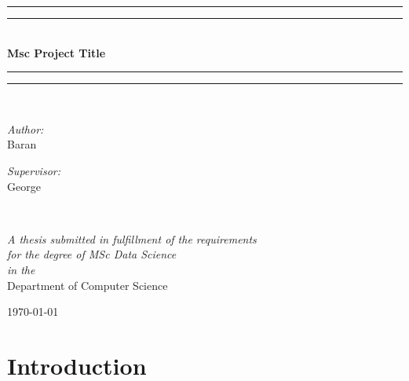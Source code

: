 \documentclass{article}
\begin{document}
\begin{titlepage}
    \begin{center}
        \vspace*{.06\textheight}{\scshape\LARGE Birkbeck, University of London\par}\vspace{1.5cm} %
        \rule[0.5ex]{\linewidth}{2pt}\vspace*{-\baselineskip}\vspace*{3.2pt}
        \rule[0.5ex]{\linewidth}{1pt}\\[\baselineskip]
        \huge{\bfseries Msc Project Title}\\[4mm]
        \rule[0.5ex]{\linewidth}{1pt}\vspace*{-\baselineskip}\vspace{3.2pt}
        \rule[0.5ex]{\linewidth}{2pt}\\
        [1.5cm]


            \begin{minipage}[t]{\textwidth}
            \begin{flushleft} \large
            \emph{Author:}\\
            {Baran} %
            \end{flushleft}
            \end{minipage}
            \begin{minipage}[t]{0.4\textwidth}
            \begin{flushright} \large
            \emph{Supervisor:} \\
            {George} %
            \end{flushright}
            \end{minipage}\\
            [3cm]

            \vfill

            \large \textit{A thesis submitted in fulfillment of the requirements\\ for the degree of MSc Data Science}\\[0.3cm] %
            \textit{in the}\\[0.4cm]
            Department of Computer Science\\[2cm] %
 
            \vfill

            {\large \today}\\[4cm] %
 
            
            \vfill
    \end{center}
\end{titlepage}    

\section{Introduction}
\end{document}
